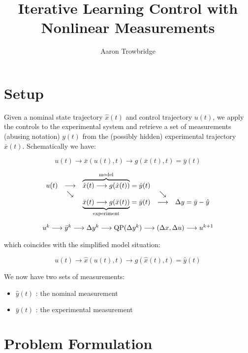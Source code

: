 \documentclass{article}
\title{Iterative Learning Control with \\ Nonlinear Measurements}
\author{Aaron Trowbridge}
\date{}
\newcommand{\QP}{\text{QP}}
\begin{document}
\maketitle

\section*{Setup}

Given a nominal state trajectory $\hat{x}(t)$ and control trajectory $u(t)$, we apply the controls to the experimental system and retrieve a set of measurements (abusing notation) $y(t)$ from the (possibly hidden) experimental trajectory $\bar x (t)$. Schematically we have:

$$
u(t) \longrightarrow \bar x (u(t), t) \longrightarrow g(\bar x(t), t) = \bar y(t)
$$

\begin{equation*}
\mqty{
  u(t) & \longrightarrow & \overbrace{\hat x(t) \longrightarrow g(\hat x(t))}^{\text{model}} = \hat y(t) & \\
  & \searrow & & \searrow \\
  & &  \underbrace{\bar x(t) \longrightarrow g(\bar x(t))}_{\text{experiment}} = \bar y(t) & \longrightarrow & \Delta y = \bar y - \hat y \\
}
\end{equation*}


\begin{equation*}
  \mqty{
    u^k \longrightarrow \bar y^k \longrightarrow \Delta y^k \longrightarrow \QP(\Delta y^k) \longrightarrow (\Delta x, \Delta u) \longrightarrow u^{k + 1}
  }
\end{equation*}

 
which coincides with the simplified model situation:

$$
u(t) \longrightarrow \hat x (u(t), t) \longrightarrow g(\hat x(t), t) = \hat y(t)
$$


We now have two sets of measurements: 

\begin{itemize}
  \item $\hat y(t)$ : the nominal measurement
  \item $\bar y(t)$ : the experimental measurement
\end{itemize}

\section*{Problem Formulation}
\end{document}
